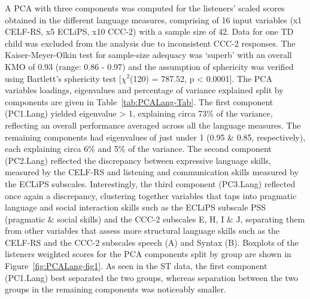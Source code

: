 \documentclass[a4paper, twoside]{templates/ociamthesis}
\begin{document}
A PCA with three components was computed for the listeners' scaled scores obtained in the different language measures, comprising of 16 input variables (x1 CELF-RS, x5 ECLiPS, x10 CCC-2) with a sample size of 42. Data for one TD child was excluded from the analysis due to inconsistent CCC-2 responses. The Kaiser-Meyer-Olkin test for sample-size adequacy was `superb' \autocite{Field2012Chpt17} with an overall KMO of 0.93 (range: 0.86 - 0.97) and the assumption of sphericity was verified using Bartlett's sphericity test {[}\(\chi^2\)(120) = 787.52, p \textless{} 0.0001{]}. The PCA variables loadings, eigenvalues and percentage of variance explained split by components are given in Table~\ref{tab:PCALang-Tab}. The first component (PC1.Lang) yielded eigenvalue \textgreater{} 1, explaining circa 73\% of the variance, reflecting an overall performance averaged across all the language measures. The remaining components had eigenvalues of just under 1 (0.95 \& 0.85, respectively), each explaining circa 6\% and 5\% of the variance. The second component (PC2.Lang) reflected the discrepancy between expressive language skills, measured by the CELF-RS and listening and communication skills measured by the ECLiPS subscales. Interestingly, the third component (PC3.Lang) reflected once again a discrepancy, clustering together variables that taps into pragmatic language and social interaction skills such as the ECLiPS subscale PSS (pragmatic \& social skills) and the CCC-2 subscales E, H, I \& J, separating them from other variables that assess more structural language skills such as the CELF-RS and the CCC-2 subscales speech (A) and Syntax (B). Boxplots of the listeners weighted scores for the PCA components split by group are shown in Figure~\ref{fig:PCALang-fig1}. As seen in the ST data, the first component (PC1.Lang) best separated the two groups, whereas separation between the two groups in the remaining components was noticeably smaller.\\
\end{document}
